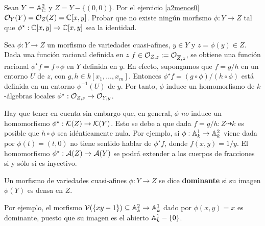 \documentclass[ACGA.tex]{subfiles}
\begin{document}
\begin{ejer}
 Sean $Y=\mathbb{A}^2_{\mathbb{C}}$ y $Z=Y-\{(0,0)\}$. Por el ejercicio \ref{a2menos0} ${\mathcal O}_{Y}(Y)={\mathcal O}_{Z}(Z)=\mathbb{C}[x,y]$. Probar que no existe ningún morfismo $\phi:Y\to Z$ tal que $\phi^\star:\mathbb{C}[x,y]\to\mathbb{C}[x,y]$ sea la identidad.
\end{ejer}



Sea $\phi:Y\to Z$ un morfismo de variedades cuasi-afines, $y\in Y$ y $z=\phi(y)\in Z$. Dada una función racional definida en $z$  $f\in{\mathcal O}_{Z,z}:={\mathcal O}_{\overline Z,z}$, se obtiene una función racional $\phi^\star f=f\circ\phi$ en $Y$ definida en $y$. En efecto, supongamos que $f=g/h$ en un entorno $U$ de $z$, con $g,h\in k[x_1,\ldots,x_m]$. Entonces $\phi^\star f=(g\circ \phi)/(h\circ\phi)$ está definida en un entorno $\phi^{-1}(U)$ de $y$. Por tanto, $\phi$ induce un homomorfismo de $k$-álgebras locales $\phi^\star:{\mathcal O}_{Z,z}\to{\mathcal O}_{Y,y}$.

Hay que tener en cuenta sin embargo que, en general, $\phi$ \emph{no} induce un homomorfismo $\phi^\star:{\mathcal K}(Z)\to{\mathcal K}(Y)$. Esto se debe a que dada $f=g/h:Z\dashrightarrow k$ es posible que $h\circ\phi$ sea idénticamente nula. Por ejemplo, si $\phi:\mathbb{A}^1_k\to\mathbb{A}^2_k$ viene dada por $\phi(t)=(t,0)$ no tiene sentido hablar de $\phi^\star f$, donde $f(x,y)=1/y$. El homomorfismo $\phi^\star:\mathcal{A}(Z)\to\mathcal{A}(Y)$ se podrá extender a los cuerpos de fracciones si y sólo si es inyectivo.

\begin{defi}
 Un morfismo de variedades cuasi-afines $\phi:Y\to Z$ se dice {\bf dominante} si su imagen $\phi(Y)$ es densa en $Z$. 
\end{defi}

Por ejemplo, el morfismo $\mathcal{V}(\{xy-1\})\subseteq\mathbb{A}^2_k\to\mathbb{A}^1_k$ dado por $\phi(x,y)=x$ es dominante, puesto que su imagen es el abierto $\mathbb{A}^1_k-\{0\}$.
\end{document}
